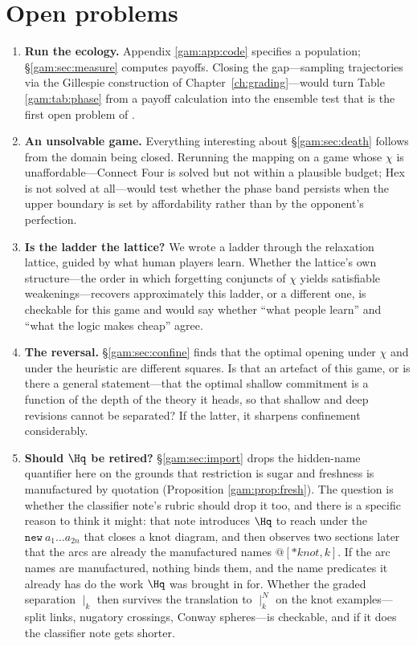 \section{Open problems}\label{gam:S12}

\begin{enumerate}
\item \textbf{Run the ecology.} Appendix \ref{gam:app:code} specifies a population;
\S\ref{gam:sec:measure} computes payoffs. Closing the gap---sampling trajectories
via the Gillespie construction of Chapter~\ref{ch:grading}---would turn Table
\ref{gam:tab:phase} from a payoff calculation into the ensemble test that is the
first open problem of \chSci.

\item \textbf{An unsolvable game.} Everything interesting about
\S\ref{gam:sec:death} follows from the domain being closed. Rerunning the mapping on
a game whose $\chi$ is unaffordable---Connect Four is solved but not within a
plausible budget; Hex is not solved at all---would test whether the phase band
persists when the upper boundary is set by affordability rather than by the
opponent's perfection.

\item \textbf{Is the ladder the lattice?} We wrote a ladder through the
relaxation lattice, guided by what human players learn. Whether the lattice's own
structure---the order in which forgetting conjuncts of $\chi$ yields satisfiable
weakenings---recovers approximately this ladder, or a different one, is
checkable for this game and would say whether ``what people learn'' and ``what
the logic makes cheap'' agree.

\item \textbf{The reversal.} \S\ref{gam:sec:confine} finds that the optimal opening
under $\chi$ and under the heuristic are different squares. Is that an artefact
of this game, or is there a general statement---that the optimal shallow
commitment is a function of the depth of the theory it heads, so that shallow
and deep revisions cannot be separated? If the latter, it sharpens confinement
considerably.

\item \textbf{Should $\Hq$ be retired?} \S\ref{gam:sec:import} drops the hidden-name
quantifier here on the grounds that restriction is sugar and freshness is
manufactured by quotation (Proposition \ref{gam:prop:fresh}). The question is
whether the classifier note's rubric should drop it too, and there is a specific
reason to think it might: that note introduces $\Hq$ to reach under the
$\texttt{new}\ a_1 \dots a_{2n}$ that closes a knot diagram, and then observes
two sections later that the arcs are already the manufactured names
$@[*\mathit{knot},k]$. If the arc names are manufactured, nothing binds them,
and the name predicates it already has do the work $\Hq$ was brought in for.
Whether the graded separation $\mid_k$ then survives the translation to
$\mid_k^N$ on the knot examples---split links, nugatory crossings, Conway
spheres---is checkable, and if it does the classifier note gets shorter.


\end{enumerate}
